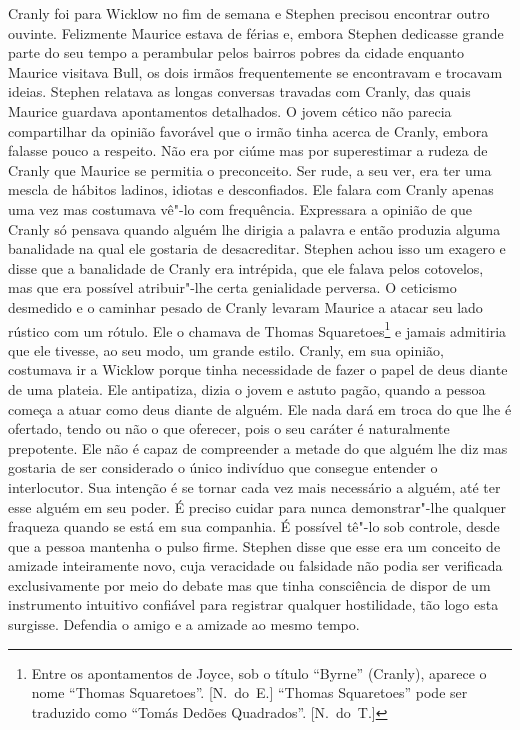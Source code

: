 Cranly foi para Wicklow no fim de semana e Stephen precisou encontrar outro
ouvinte.  Felizmente Maurice estava de férias e, embora Stephen dedicasse
grande parte do seu tempo a perambular pelos bairros pobres da cidade enquanto
Maurice visitava Bull, os dois irmãos frequentemente se encontravam e trocavam
ideias.  Stephen relatava as longas conversas travadas com Cranly, das quais
Maurice guardava apontamentos detalhados.  O jovem cético não parecia
compartilhar da opinião favorável que o irmão tinha acerca de Cranly, embora
falasse pouco a respeito.  Não era por ciúme mas por superestimar a rudeza de
Cranly que Maurice se permitia o preconceito.  Ser rude, a seu ver, era ter uma
mescla de hábitos ladinos, idiotas e desconfiados.  Ele falara com Cranly
apenas uma vez mas costumava vê"-lo com frequência.  Expressara a opinião de que
Cranly só pensava quando alguém lhe dirigia a palavra e então produzia
alguma banalidade na qual ele gostaria de desacreditar.  Stephen achou isso um
exagero e disse que a banalidade de Cranly era intrépida, que ele \label{falava"-pelos} falava pelos
cotovelos, mas que era possível atribuir"-lhe certa genialidade perversa.  O
ceticismo desmedido e o caminhar pesado de Cranly levaram Maurice \label{a"-atacar} a atacar seu
lado rústico com um rótulo.  Ele o chamava de Thomas Squaretoes\footnote[\setcounter{symbol}{1}]{
Entre os apontamentos de Joyce, sob o título “Byrne” (Cranly), aparece o nome
“Thomas Squaretoes”. [N.~do~E.]  “Thomas Squaretoes” pode ser traduzido como
“Tomás Dedões Quadrados”. [N.~do~T.]} e jamais admitiria que ele
tivesse, ao seu modo, um grande estilo.  Cranly, em sua opinião, costumava ir a
Wicklow porque tinha necessidade de \label{fazer"-o} fazer o papel de deus diante de uma
plateia.  Ele antipatiza, dizia o jovem e astuto pagão, quando a pessoa
começa a atuar como deus diante de alguém.  Ele nada dará em troca do que lhe é
ofertado, tendo ou não o que oferecer, pois o seu caráter é
naturalmente prepotente.  Ele não é capaz de compreender a metade do que alguém
lhe diz mas gostaria de ser considerado o único indivíduo que consegue entender
o interlocutor.  Sua intenção é se tornar cada vez mais necessário a alguém,
até ter esse alguém em seu poder.  É preciso cuidar para nunca demonstrar"-lhe
qualquer fraqueza quando se está em sua companhia.  É possível tê"-lo sob
controle, desde que a pessoa mantenha o pulso firme.  Stephen disse que esse
era um conceito de amizade inteiramente novo, cuja veracidade ou falsidade não
podia ser verificada exclusivamente por meio do debate mas que tinha
consciência de dispor de um instrumento intuitivo confiável para registrar
qualquer hostilidade, tão logo esta surgisse.  Defendia o amigo e a amizade ao
mesmo tempo.

